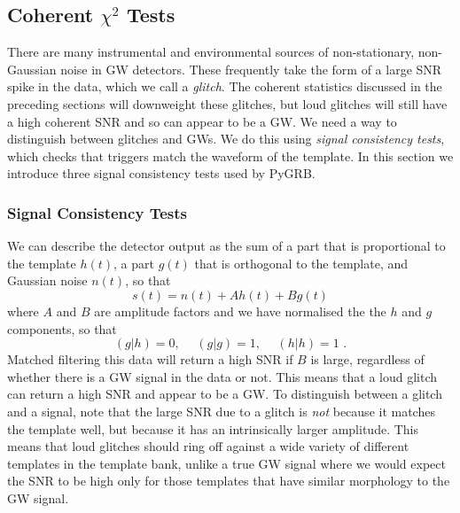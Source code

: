 \documentclass[11pt]{cuthesis}
\newcommand{\fs}{\text{ .}}
\begin{document}
\subsection{Coherent $\chi^2$ Tests} \label{sec:coh chisq}
There are many instrumental and environmental sources of non-stationary, non-Gaussian noise in GW detectors. These frequently take the form of a large SNR spike in the data, which we call a \textit{glitch}. The coherent statistics discussed in the preceding sections will downweight these glitches, but loud glitches will still have a high coherent SNR and so can appear to be a GW. We need a way to distinguish between glitches and GWs. We do this using \textit{signal consistency tests}, which checks that triggers match the waveform of the template. In this section we introduce three signal consistency tests used by PyGRB.

\subsubsection{Signal Consistency Tests }
We can describe the detector output as the sum of a part that is proportional to the template $h(t)$, a part $g(t)$ that is orthogonal to the template, and Gaussian noise $n(t)$, so that
\begin{equation}
s(t) = n(t) + Ah(t) + Bg(t)
\end{equation}
where $A$ and $B$ are amplitude factors and we have normalised the the $h$ and $g$ components, so that
\begin{equation}
(g|h)=0, \hspace{15pt} (g|g)=1, \hspace{15pt} (h|h)=1 \fs
\end{equation}
Matched filtering this data will return a high SNR if $B$ is large, regardless of whether there is a GW signal in the data or not. This means that a loud glitch can return a high SNR and appear to be a GW. To distinguish between a glitch and a signal, note that the large SNR due to a glitch is \textit{not} because it matches the template well, but because it has an intrinsically larger amplitude. This means that loud glitches should ring off against a wide variety of different templates in the template bank, unlike a true GW signal where we would expect the SNR to be high only for those templates that have similar morphology to the GW signal. 
\end{document}
